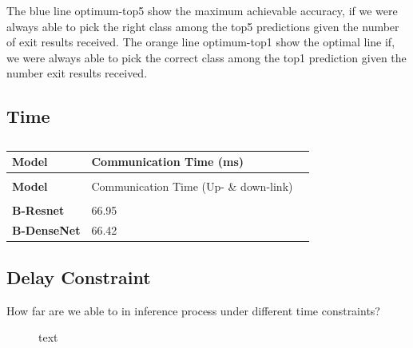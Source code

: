 The blue line optimum-top5 show the maximum achievable accuracy, if we were always able to pick the right class among the top5 predictions given the number of exit results received. The orange line optimum-top1 show the optimal line if, we were always able to pick the correct class among the top1 prediction given the number exit results received.


\subsection{Time}

\begin{longtabu}{>{\bfseries}X|X|X}
	\caption[]{} \label{tbl:time-offloadinf} \\
	\toprule
	\rowfont{\bfseries}
	Model & Communication Time (ms) &    \tabularnewline
	\bottomrule
	\endfirsthead
	\\
	\toprule
	\rowfont{\bfseries}
	Model & Communication Time (Up- \& down-link) &    \tabularnewline
	\bottomrule
	\endhead %
	\bottomrule
	\\
	\endfoot
	\hline
	\endlastfoot
	B-Resnet	& 66.95	&  \tabularnewline
	\hline
	B-DenseNet	& 66.42	& \tabularnewline 								
	\bottomrule
\end{longtabu}


\subsection{Delay Constraint}

How far are we able to in inference process under different time constraints? 

\begin{figure}
	\centering
	\hfill
	\caption[short text]{text}
	\label{fig:exit-reached}
\end{figure}


